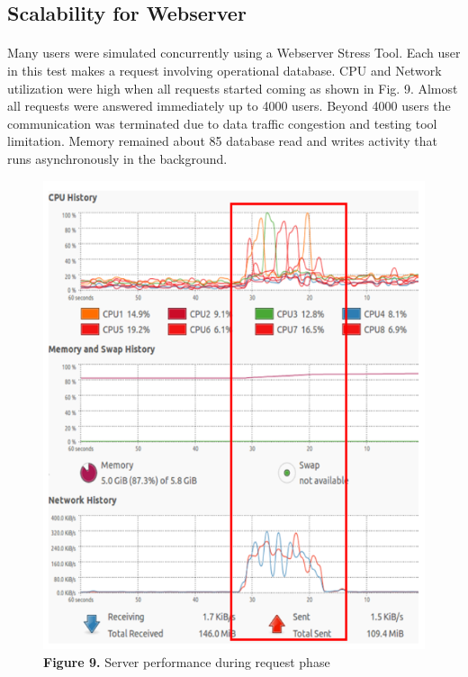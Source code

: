 \documentclass[a4paper,12pt,oneside]{article}
\let\counterwithin\relax
\begin{document}
\newpage
\subsection{Scalability for Webserver}
\paragraph{}
Many users were simulated concurrently using a Webserver
Stress Tool. Each user in this test makes a request involving
operational database. CPU and Network utilization were high
when all requests started coming as shown in Fig. 9. Almost
all requests were answered immediately up to 4000 users.
Beyond 4000 users the communication was terminated due to
data traffic congestion and testing tool limitation. Memory
remained about 85%
database read and writes activity that runs asynchronously in
the background.
    \begin{figure}[H]
    \includegraphics{Figure9.png}
    \centering
    \caption{\textbf{Figure 9.} Server performance during request phase}
    \end{figure}
\end{document}

